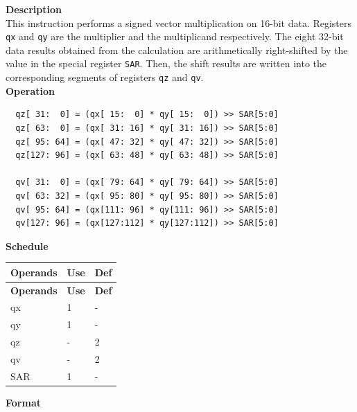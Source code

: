 \textbf{Description}\\
This instruction performs a signed vector multiplication on 16-bit data. Registers \lstinline{qx} and \lstinline{qy} are the multiplier and the multiplicand respectively. The eight 32-bit data results obtained from the calculation are arithmetically right-shifted by the value in the special register \lstinline{SAR}. Then, the shift results are written into the corresponding segments of registers \lstinline{qz} and \lstinline{qv}.\\
\textbf{Operation}
\begin{lstlisting}
  qz[ 31:  0] = (qx[ 15:  0] * qy[ 15:  0]) >> SAR[5:0]
  qz[ 63:  0] = (qx[ 31: 16] * qy[ 31: 16]) >> SAR[5:0]
  qz[ 95: 64] = (qx[ 47: 32] * qy[ 47: 32]) >> SAR[5:0]
  qz[127: 96] = (qx[ 63: 48] * qy[ 63: 48]) >> SAR[5:0]

  qv[ 31:  0] = (qx[ 79: 64] * qy[ 79: 64]) >> SAR[5:0]
  qv[ 63: 32] = (qx[ 95: 80] * qy[ 95: 80]) >> SAR[5:0]
  qv[ 95: 64] = (qx[111: 96] * qy[111: 96]) >> SAR[5:0]
  qv[127: 96] = (qx[127:112] * qy[127:112]) >> SAR[5:0]
\end{lstlisting}


\textbf{Schedule}\\
\begin{longtable}[c]{|l|l|l|}
    \hline
    \rowcolor{lightgray}
    \textbf{Operands} & \textbf{Use} & \textbf{Def} \\\hline
    \endfirsthead
    \hline
    \rowcolor{lightgray}
     \textbf{Operands} & \textbf{Use} & \textbf{Def} \\\hline
    \endhead
    \hline
    \endfoot

    qx & 1 & - \\\hline
  qy & 1 & - \\\hline
     qz & - & 2 \\\hline
     qv & - & 2 \\\hline
    SAR & 1 & -

\end{longtable}

\textbf{Format}\\

